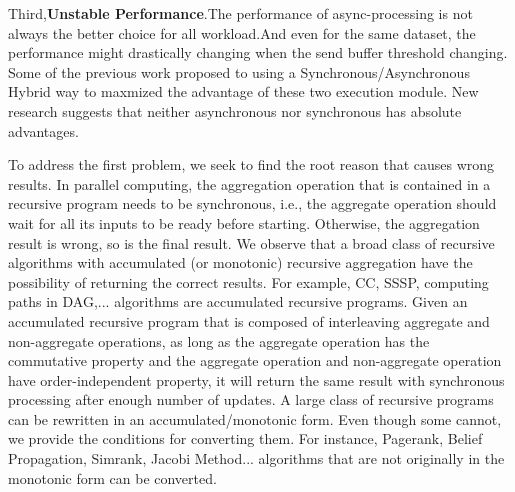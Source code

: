 {\color{red}
Third,\textbf{Unstable Performance}.The performance of async-processing is not always the better choice for all workload\cite{Fan2018Adaptive,Xie2015SYNC}.And even for the same dataset, the performance might drastically changing when the send buffer threshold changing. Some of the previous work proposed to using a Synchronous/Asynchronous Hybrid way to maxmized the advantage of these two execution module. New research suggests that neither asynchronous nor synchronous has absolute advantages\cite{Fan2018Adaptive, Xie2015SYNC}.

}



To address the first problem, we seek to find the root reason that causes wrong results. In parallel computing, the aggregation operation that is contained in a recursive program needs to be synchronous, i.e., the aggregate operation should wait for all its inputs to be ready before starting. Otherwise, the aggregation result is wrong, so is the final result. We observe that a broad class of recursive algorithms with accumulated (or monotonic) recursive aggregation have the possibility of returning the correct results. For example, CC, SSSP, computing paths in DAG,... algorithms are accumulated recursive programs. Given an accumulated recursive program that is composed of interleaving aggregate and non-aggregate operations, as long as the aggregate operation has the commutative property and the aggregate operation and non-aggregate operation have order-independent property, it will return the same result with synchronous processing after enough number of updates. A large class of recursive programs can be rewritten in an accumulated/monotonic form. Even though some cannot, we provide the conditions for converting them. For instance, Pagerank, Belief Propagation, Simrank, Jacobi Method... algorithms that are not originally in the monotonic form can be converted.

